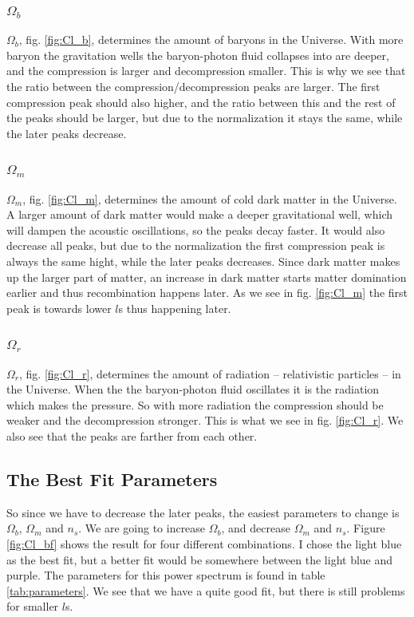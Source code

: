 \documentclass[a4paper,norsk, 10pt]{article}
\begin{document}
\subsubsection{$\Omega_b$}
$\Omega_b$, fig. \ref{fig:Cl_b}, determines the amount of baryons in the Universe. With more baryon the gravitation wells the baryon-photon fluid collapses into are deeper, and the compression is larger and decompression smaller. This is why we see that the ratio between the compression/decompression peaks are larger. The first compression peak should also higher, and the ratio between this and the rest of the peaks should be larger, but due to the normalization it stays the same, while the later peaks decrease. 

\subsubsection{$\Omega_m$}
$\Omega_m$, fig. \ref{fig:Cl_m}, determines the amount of cold dark matter in the Universe. A larger amount of dark matter would make a deeper gravitational well, which will dampen the acoustic oscillations, so the peaks decay faster. It would also decrease all peaks, but due to the normalization the first compression peak is always the same hight, while the later peaks decreases. Since dark matter makes up the larger part of matter, an increase in dark matter starts matter domination earlier and thus recombination happens later. As we see in fig. \ref{fig:Cl_m} the first peak is towards lower $l$s thus happening	 later.

\subsubsection{$\Omega_r$}
$\Omega_r$, fig. \ref{fig:Cl_r}, determines the amount of radiation -- relativistic particles -- in the Universe. When the the baryon-photon fluid oscillates it is the radiation which makes the pressure. So with more radiation the compression should be weaker and the decompression stronger. This is what we see in fig. \ref{fig:Cl_r}. We also see that the peaks are farther from each other.


\subsection{The Best Fit Parameters}

So since we have to decrease the later peaks, the easiest parameters to change is $\Omega_b$, $\Omega_m$ and $n_s$. We are going to increase $\Omega_b$, and decrease $\Omega_m$ and $n_s$. Figure \ref{fig:Cl_bf} shows the result for four different combinations. I chose the light blue as the best fit, but a better fit would be somewhere between the light blue and purple. The parameters for this power spectrum is found in table \ref{tab:parameters}. We see that we have a quite good fit, but there is still problems for smaller $l$s. 
\end{document}
